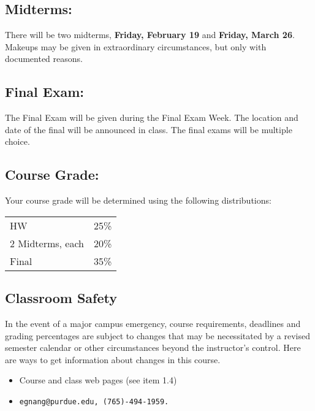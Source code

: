 \documentclass[10pt]{article}
\begin{document}
\subsection{Midterms:}  
	There will be two midterms, {\bf Friday, February 19} and 
  {\bf Friday, March 26}. Makeups may be given in extraordinary
  circumstances, but only with documented reasons.

\subsection{Final Exam:}
        The Final Exam will be given during the Final Exam Week.
        The location and date of the final will be announced in class.
	The final exams will be multiple choice.

\subsection{Course Grade:}
        Your course grade will be determined using the following 
        distributions:

\begin{tabular}{ll}\\
        HW 		&    25\%\\
        2 Midterms, each     &  20\%\\
        Final          &     35\%\\
\end{tabular}


\subsection{Classroom Safety}
In the event of a major campus emergency, course requirements,
deadlines and grading percentages are subject to changes that may be
necessitated by a revised semester calendar or other circumstances
beyond the instructor's control. Here are ways to get information
about changes in this course.

\begin{itemize}
\item Course and class web pages (see item 1.4)
\item \tt{egnang@purdue.edu}, \tt{(765)-494-1959}.
\end{itemize}
\end{document}
